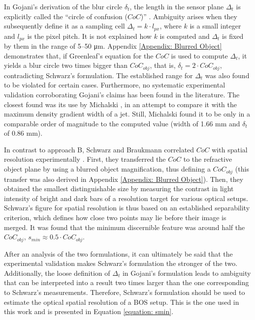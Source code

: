 \par In Gojani's derivation of the blur circle $\delta_t$, the length in the sensor plane $\Delta_t$ is explicitly called the ``circle of confusion ($CoC$)'' \cite{Gojani&Obayashi}. Ambiguity arises when they subsequently define it as a sampling cell $\Delta_t = k \cdot l_{px}$, where $k$ is a small integer and $l_{px}$ is the pixel pitch. It is not explained how $k$ is computed and $\Delta_t$ is fixed by them in the range of 5--50 \si{\micro\metre}. Appendix \ref{Appendix: Blurred Object} demonstrates that, if Greenleaf's equation for the $CoC$ \cite{Greenleaf1950} is used to compute $\Delta_t$, it yields a blur circle two times bigger than $CoC_{obj}$, that is, $\delta_t = 2 \cdot CoC_{obj}$, contradicting Schwarz's formulation. The established range for $\Delta_t$ was also found to be violated for certain cases. Furthermore, no systematic experimental validation corroborating Gojani's claims has been found in the literature. The closest found was its use by Michalski \cite{Michalski2018}, in an attempt to compare it with the maximum density gradient width of a jet. Still, Michalski found it to be only in a comparable order of magnitude to the computed value (width of 1.66 mm and $\delta_t$ of 0.86 mm).

\par In contrast to approach B, Schwarz and Braukmann correlated $CoC$ with spatial resolution experimentally \cite{Schwarz&Braukmann}. First, they transferred the $CoC$ to the refractive object plane by using a blurred object magnification, thus defining a $CoC_{obj}$ (this transfer was also derived in Appendix \ref{Appendix: Blurred Object}). Then, they obtained the smallest distinguishable size by measuring the contrast in light intensity of bright and dark bars of a resolution target for various optical setups. Schwarz's figure for spatial resolution is thus based on an established separability criterion, which defines how close two points may lie before their image is merged. It was found that the minimum discernible feature was around half the $CoC_{obj}$, $s_{min} \approx 0.5 \cdot CoC_{obj}$.

\par After an analysis of the two formulations, it can ultimately be said that the experimental validation makes Schwarz's formulation the stronger of the two. Additionally, the loose definition of $\Delta_t$ in Gojani's formulation leads to ambiguity that can be interpreted into a result two times larger than the one corresponding to Schwarz's measurements. Therefore, Schwarz's formulation should be used to estimate the optical spatial resolution of a BOS setup. This is the one used in this work and is presented in Equation \ref{equation: smin}.

